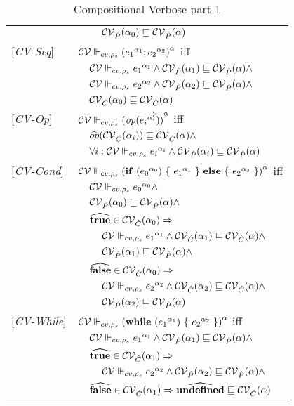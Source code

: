 \begin{table}[htb]
\begin{tabular}{l l l l}
&&&$\Pat(\all_0) \sqsubseteq \Pat(\all) $\\
{[\textit{CV-Seq}]}&\multicolumn{3}{l}{$ \ccestl {\lbt 1;\lbt 2} $ iff } \\ 
&&\multicolumn{2}{l}{$\ccest {\lbt 1} \wedge\Pat(\all_1) \sqsubseteq \Pat(\all) \wedge$} \\
&&\multicolumn{2}{l}{$\ccest {\lbt 2}\wedge \Pat(\all_2) \sqsubseteq \Pat(\all) \wedge$} \\
&&\multicolumn{2}{l}{$\Cat(\all_0) \sqsubseteq \Cat(\all)$} \\
{[\textit{CV-Op}]}&\multicolumn{3}{l}{$ \ccestl {\op (\vec{\lbt i})} $ iff}\\
&&\multicolumn{2}{l}{$\widehat{op} (\Cat(\all_i)) \sqsubseteq \Cat(\all) \wedge$}\\
&&\multicolumn{2}{l}{$\forall i : \ccest {\lbt i} \wedge \Pat(\all_i) \sqsubseteq \Pat(\all)  $}\\
{[\textit{CV-Cond}]}&\multicolumn{3}{l}{$\ccestl{\cond {\lbt 0} {\lbt 1} {\lbt 2}} $ iff}\\
&&\multicolumn{2}{l}{$ \ccest {\lbt 0} \wedge $}\\
&&\multicolumn{2}{l}{$\Pat(\all_0) \sqsubseteq \Pat(\all) \wedge$} \\
&&\multicolumn{2}{l}{$\widehat{\true} \in \Cat(\all_0) \Rightarrow$}\\
&&&$\ccest {\lbt 1} \wedge \Cat(\all_1) \sqsubseteq \Cat(\all)\wedge$\\
&&&$\Pat(\all_1) \sqsubseteq \Pat(\all) \wedge$ \\
&&\multicolumn{2}{l}{$\widehat{\false} \in \Cat(\all_0) \Rightarrow$}\\
&&&$\ccest {\lbt 2} \wedge \Cat(\all_2) \sqsubseteq \Cat(\all) \wedge$\\
&&&$\Pat(\all_2) \sqsubseteq \Pat(\all)$ \\
{[\textit{CV-While}]}&\multicolumn{3}{l}{$\ccestl {\while {\lbt 1} {\lbt 2}} $ iff}\\
&&\multicolumn{2}{l}{$ \ccest {\lbt 1} \wedge \Pat(\all_1) \sqsubseteq \Pat(\all) \wedge$}\\
&&\multicolumn{2}{l}{$\widehat{\true} \in \Cat(\all_1) \Rightarrow$}\\
&&&$\ccest {\lbt 2} \wedge \Pat(\all_2) \sqsubseteq \Pat(\all)\wedge$\\
&&\multicolumn{2}{l}{$\widehat{\false} \in \Cat(\all_1) \Rightarrow \widehat{\undef} \sqsubseteq \Cat(\all)$}\\
\end{tabular}
\caption{Compositional Verbose part 1}
\label{tab:CompVerb1}
\end{table}


